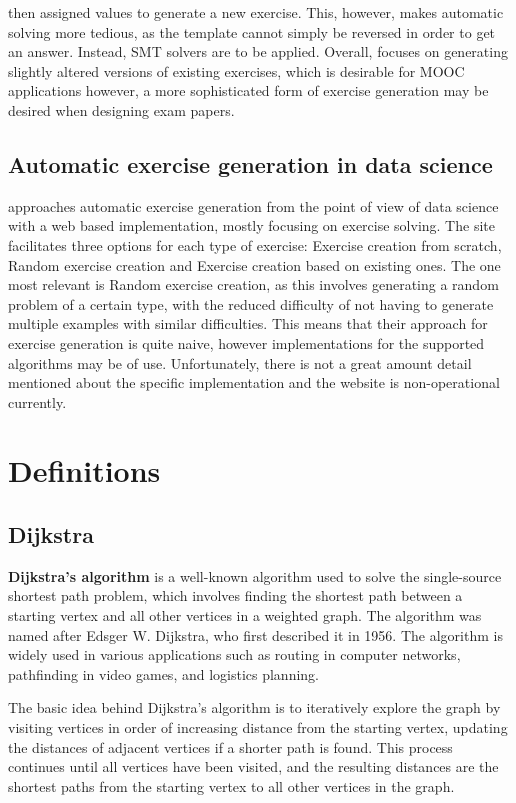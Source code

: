 \documentclass{l4proj}
\begin{document}
then assigned values to generate a new exercise. This, however, makes automatic solving more tedious, as the template cannot simply be reversed in order to get an answer. Instead, SMT solvers are to be applied. Overall, \citet{Sad12} focuses on generating slightly altered versions of existing exercises, which is desirable for MOOC applications however, a more sophisticated form of exercise generation may be desired when designing exam papers.

\subsection{Automatic exercise generation in data science}
\citet{Kot19} approaches automatic exercise generation from the point of view of data science with a web based implementation, mostly focusing on exercise solving. The site facilitates three options for each type of exercise: Exercise creation from scratch, Random exercise creation and Exercise creation based on existing ones. The one most relevant is Random exercise creation, as this involves generating a random problem of a certain type, with the reduced difficulty of not having to generate multiple examples with similar difficulties. This means that their approach for exercise generation is quite naive, however implementations for the supported algorithms may be of use. Unfortunately, there is not a great amount detail mentioned about the specific implementation and the website is non-operational currently.

\section{Definitions}
\subsection{Dijkstra}
\cite{a}
\textbf{Dijkstra's algorithm} is a well-known algorithm used to solve the single-source shortest path problem, which involves finding the shortest path between a starting vertex and all other vertices in a weighted graph. The algorithm was named after Edsger W. Dijkstra, who first described it in 1956. The algorithm is widely used in various applications such as routing in computer networks, pathfinding in video games, and logistics planning.

The basic idea behind Dijkstra's algorithm is to iteratively explore the graph by visiting vertices in order of increasing distance from the starting vertex, updating the distances of adjacent vertices if a shorter path is found. This process continues until all vertices have been visited, and the resulting distances are the shortest paths from the starting vertex to all other vertices in the graph.
\end{document}
